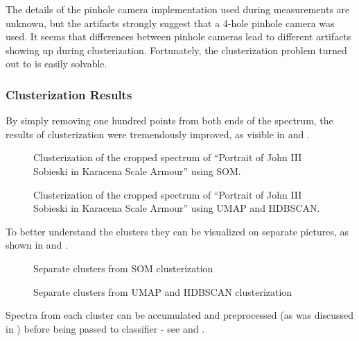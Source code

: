 The details of the pinhole camera implementation used during measurements are unknown, but the artifacts strongly suggest that a 4-hole pinhole camera was used. 
It seems that differences between pinhole cameras lead to different artifacts showing up during clusterization. 
Fortunately, the clusterization problem turned out to is easily solvable.

\newpage
\subsubsection{Clusterization Results}
By simply removing one hundred points from both ends of the spectrum, the results of clusterization were tremendously improved, as visible in  and .

\begin{figure}[H]
  \centering
  
  \caption{Clusterization of the cropped spectrum of ``Portrait of John III Sobieski in Karacena Scale Armour'' using SOM.}
  \label{fig:som-clusterization-clean}
\end{figure}

\begin{figure}[H]
  \centering
  
  \caption{Clusterization of the cropped spectrum of ``Portrait of John III Sobieski in Karacena Scale Armour'' using UMAP and HDBSCAN.}
  \label{fig:hdbscan-clusterization-clean}
\end{figure}

\newpage
To better understand the clusters they can be visualized on separate pictures, as shown in  and .
\begin{figure}[!htbp]
  \centering
  
  \caption{Separate clusters from SOM clusterization}
  \label{fig:som-clusters-clean}
\end{figure}

\begin{figure}[!htbp]
  \centering
  
  \caption{Separate clusters from UMAP and HDBSCAN clusterization}
  \label{fig:hdbscan-clusters-clean}
\end{figure}


\newpage
Spectra from each cluster can be accumulated and preprocessed (as was discussed in )  before being passed to classifier - see  and .

